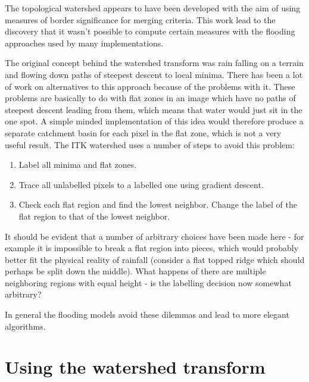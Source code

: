 \documentclass{InsightArticle}
\begin{document}
The topological watershed appears to have been developed with the aim
of using measures of border significance for merging criteria. This
work lead to the discovery that it wasn't possible to compute certain
measures with the flooding approaches used by many implementations.


\label{sect:rainfall}
The original concept behind the
watershed transform was rain falling on a terrain and flowing down
paths of steepest descent to local minima. There has been a lot of
work on alternatives to this approach because of the problems with
it. These problems are basically to do with flat zones in an image
which have no paths of steepest descent leading from them, which means
that water would just sit in the one spot. A simple minded
implementation of this idea would therefore produce a separate
catchment basin for each pixel in the flat zone, which is not a very
useful result. The ITK watershed uses a number of steps to avoid this problem:
\begin{enumerate}
\item Label all minima and flat zones.
\item Trace all unlabelled pixels to a labelled one using gradient descent.
\item Check each flat region and find the lowest neighbor. Change the label of the flat region to that of the lowest neighbor.
\end{enumerate}
 
It should be evident that a number of arbitrary choices have been made
here - for example it is impossible to break a flat region into
pieces, which would probably better fit the physical reality of
rainfall (consider a flat topped ridge which should perhaps be split
down the middle). What happens of there are multiple neighboring
regions with equal height - is the labelling decision now somewhat arbitrary?

In general the flooding models avoid these dilemmas and lead to more
elegant algorithms.


\section{Using the watershed transform}
\label{sect:usingWT}
\end{document}
